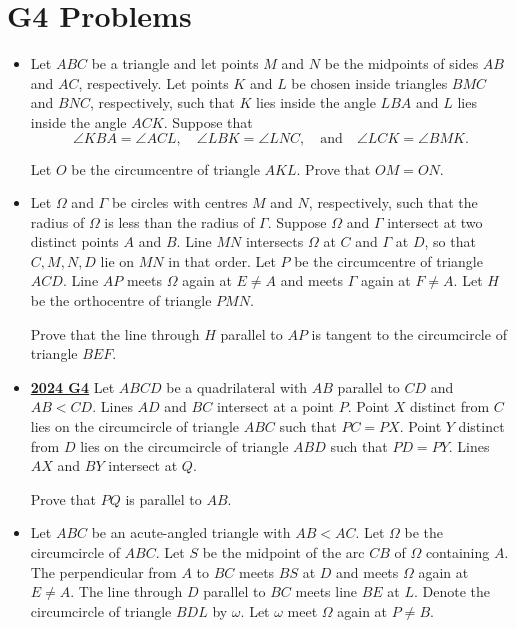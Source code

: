 \documentclass[11pt]{scrartcl}
\begin{document}
\section*{G4 Problems}  \label{G4}
\begin{itemize}[leftmargin=*]


\item {} Let $ABC$ be a triangle and let points $M$ and $N$ be the midpoints of sides $AB$ and $AC$, respectively. Let points $K$ and $L$ be chosen inside triangles $BMC$ and $BNC$, respectively, such that $K$ lies inside the angle $LBA$ and $L$ lies inside the angle $ACK$. Suppose that
$$\angle KBA= \angle ACL, \quad \angle LBK= \angle LNC, \quad \text{and} \quad \angle LCK= \angle BMK.$$

Let $O$ be the circumcentre of triangle $AKL$. Prove that $OM = ON$.

\item {}  Let $\Omega$ and $\Gamma$ be circles with centres $M$ and $N$, respectively, such that the radius of $\Omega$ is less than the radius of $\Gamma$. Suppose $\Omega$ and $\Gamma$ intersect at two distinct points $A$ and $B$. Line $MN$ intersects $\Omega$ at $C$ and $\Gamma$ at $D$, so that $C, M, N, D$ lie on $MN$ in that order. Let $P$ be the circumcentre of triangle $ACD$. Line $AP$ meets $\Omega$ again at $E\neq A$ and meets $\Gamma$ again at $F\neq A$. Let $H$ be the orthocentre of triangle $PMN$.

Prove that the line through $H$ parallel to $AP$ is tangent to the circumcircle of triangle $BEF$.
\item \href{https://artofproblemsolving.com/community/c6h3610440p35340910}{\textbf{2024 G4}} Let $ABCD$ be a quadrilateral with $AB$ parallel to $CD$ and $AB<CD$. Lines $AD$ and $BC$ intersect at a point $P$. Point $X$ distinct from $C$ lies on the circumcircle of triangle $ABC$ such that $PC=PX$. Point $Y$ distinct from $D$ lies on the circumcircle of triangle $ABD$ such that $PD=PY$. Lines $AX$ and $BY$ intersect at $Q$.

Prove that $PQ$ is parallel to $AB$.
\item {} Let $ABC$ be an acute-angled triangle with $AB < AC$. Let $\Omega$ be the circumcircle of $ABC$. Let $S$ be the midpoint of the arc $CB$ of $\Omega$ containing $A$. The perpendicular from $A$ to $BC$ meets $BS$ at $D$ and meets $\Omega$ again at $E \neq A$. The line through $D$ parallel to $BC$ meets line $BE$ at $L$. Denote the circumcircle of triangle $BDL$ by $\omega$. Let $\omega$ meet $\Omega$ again at $P \neq B$. 


\end{itemize}
\end{document}
